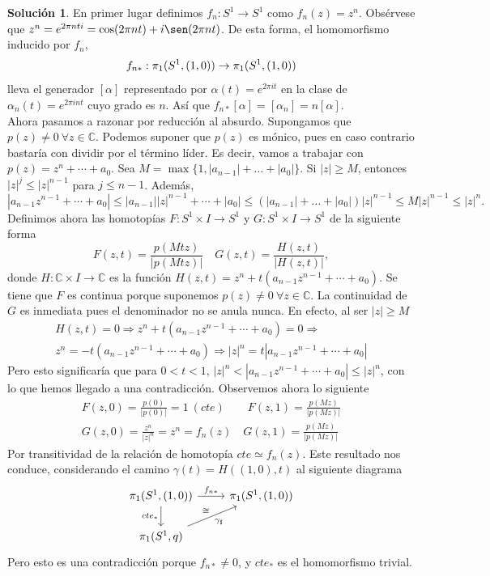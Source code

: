 \documentclass{article}
\theoremstyle{plain}
\theoremstyle{definition}
\newtheorem*{sol*}{Solución}
\begin{document}
\begin{sol*}
En primer lugar definimos $f_n:S^1\to S^1$ como $f_n(z)=z^n$. Obsérvese que $z^n=e^{2\pi nti}=\cos(2\pi nt)+i\sen(2\pi nt)$. De esta forma, el homomorfismo inducido por $f_n$,
\[
f_{n*}:\pi_1(S^1,(1,0))\to \pi_1(S^1,(1,0))\\
\]
lleva el generador $[\alpha]$ representado por $\alpha(t)=e^{2\pi it}$ en la clase de $\alpha_n(t)=e^{2\pi i nt}$ cuyo grado es $n$. Así que $f_{n*}[\alpha]=[\alpha_n]=n[\alpha]$.\\
Ahora pasamos a razonar por reducción al absurdo. Supongamos que $p(z)\neq 0\ \forall z\in\mathbb{C}$. Podemos suponer que $p(z)$ es mónico, pues en caso contrario bastaría con dividir por el término líder. Es decir, vamos a trabajar con $p(z)=z^n+\cdots + a_0$. Sea $M=\max\{1,|a_{n-1}|+\dots +|a_0|\}$. Si $|z|\geq M$, entonces $|z|^j\leq |z|^{n-1}$ para $j\leq n-1$. Además,
\[
|a_{n-1}z^{n-1}+\cdots +a_0|\leq |a_{n-1}||z|^{n-1}+\cdots +|a_0|\leq (|a_{n-1}|+\dots +|a_0|)|z|^{n-1}\leq M|z|^{n-1}\leq|z|^n.
\]
Definimos ahora las homotopías $F:S^1\times I\to S^1$ y $G:S^1\times I\to S^1$ de la siguiente forma
\[
F(z,t)=\frac{p(Mtz)}{|p(Mtz)|}\quad G(z,t)=\frac{H(z,t)}{|H(z,t)|},
\]
donde $H:\mathbb{C}\times I\to\mathbb{C}$ es la función $H(z,t)=z^n+t(a_{n-1}z^{n-1}+\cdots +a_0)$. Se tiene que $F$ es continua porque suponemos $p(z)\neq 0\ \forall z\in\mathbb{C}$. La continuidad de $G$ es inmediata pues el denominador no se anula nunca. En efecto, al ser $|z|\geq M$
\begin{gather*}
H(z,t)=0\Rightarrow z^n+t(a_{n-1}z^{n-1}+\cdots +a_0)=0\Rightarrow \\
z^n=-t(a_{n-1}z^{n-1}+\cdots +a_0)\Rightarrow |z|^n=t|a_{n-1}z^{n-1}+\cdots +a_0|
\end{gather*}
Pero esto significaría que para $0<t<1$, $|z|^n<|a_{n-1}z^{n-1}+\cdots +a_0|\leq|z|^n$, con lo que hemos llegado a una contradicción. Observemos ahora lo siguiente
\begin{gather*}
F(z,0)=\frac{p(0)}{|p(0)|}=1\ (cte)\qquad F(z,1)=\frac{p(Mz)}{|p(Mz)|}\\
G(z,0)=\frac{z^n}{|z|^n}=z^n=f_n(z)\quad G(z,1)=\frac{p(Mz)}{|p(Mz)|}
\end{gather*}
Por transitividad de la relación de homotopía $cte\simeq f_n(z)$. Este resultado nos conduce, considerando el camino $\gamma(t)=H((1,0),t)$ al siguiente diagrama
\[
\begin{tikzcd}
\pi_1(S^1,(1,0)) \ar[r, "f_{n*} "]\arrow[d,"cte_* "'] & \pi_1(S^1,(1,0))\\
\pi_1(S^1,q)\arrow[ur,"\gamma_\sharp "',"\cong"]
\end{tikzcd}
\]
Pero esto es una contradicción porque $f_{n*}\neq 0$, y $cte_*$ es el homomorfismo trivial. 
\end{sol*}
\end{document}
